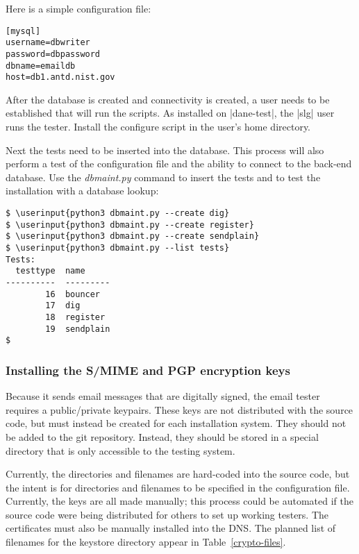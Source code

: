 \documentclass[preprint,3p,11pt]{elsarticle}
\newcommand\userinput[1]{\textbf{#1}}
\begin{document}
Here is a simple configuration file:

\begin{Verbatim}[commandchars=\\\{\},fontsize=\small]
[mysql]
username=dbwriter
password=dbpassword
dbname=emaildb
host=db1.antd.nist.gov
\end{Verbatim}

After the database is created and connectivity is created, a user
needs to be established that will run the scripts. As installed on
|dane-test|, the |slg| user runs the tester.   Install the configure
script in the user's home directory.

Next the tests need to be inserted into the database. This process
will also perform a test of the configuration file and the ability to
connect to the back-end database. Use the \emph{dbmaint.py} command to
insert the tests and to test the installation with a database lookup:

\begin{Verbatim}[commandchars=\\\{\},fontsize=\small]
$ \userinput{python3 dbmaint.py --create dig}
$ \userinput{python3 dbmaint.py --create register}
$ \userinput{python3 dbmaint.py --create sendplain}
$ \userinput{python3 dbmaint.py --list tests}
Tests:
  testtype  name
----------  ---------
        16  bouncer
        17  dig
        18  register
        19  sendplain
$
\end{Verbatim}

\subsubsection{Installing the S/MIME and PGP encryption keys}
Because it sends email messages that are digitally signed, the email
tester requires a public/private keypairs. These keys are not
distributed with the source code, but must instead be created for each
installation system. They should not be added to the git
repository. Instead, they should be stored in a special directory that
is only accessible to the testing system. 

Currently, the directories and filenames are hard-coded into the
source code, but the intent is for directories and filenames to be specified in the
configuration file. Currently, the keys are all made manually; this
process could be automated if the source code were being distributed
for others to set up working testers.  The certificates must also be
manually installed into the DNS. The planned list of filenames for the
keystore directory appear in Table~\ref{crypto-files}. 
\end{document}
